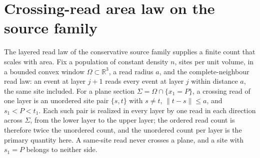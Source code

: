 \section{Crossing-read area law on the source family}
\label{sec:crossing-read-area-law}

The layered read law of the conservative source family supplies a finite
count that scales with area. Fix a population of constant density $n$,
sites per unit volume, in a bounded convex window
$\Omega\subset\mathbb R^3$, a read radius $a$, and the complete-neighbour
read law: an event at layer $j+1$ reads every event at layer $j$ within
distance $a$, the same site included. For a plane section
$\Sigma=\Omega\cap\{x_1=P\}$, a crossing read of one layer is an unordered
site pair $\{s,t\}$ with $s\neq t$, $\|t-s\|\leq a$, and $s_1<P<t_1$. Each
such pair is realized in every layer by one read in each direction across
$\Sigma$, from the lower layer to the upper layer; the ordered read count
is therefore twice the unordered count, and the unordered count per layer
is the primary quantity here. A same-site read never crosses a plane, and
a site with $s_1=P$ belongs to neither side.

